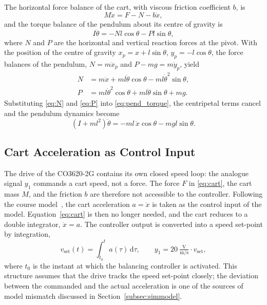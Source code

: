 The horizontal force balance of the cart, with viscous friction coefficient $b$,
is
\begin{equation}
  M\ddot{x} = F - N - b\dot{x},
  \label{eq:cart}
\end{equation}
and the torque balance of the pendulum about its centre of gravity is
\begin{equation}
  I\ddot{\theta} = -Nl\cos\theta - Pl\sin\theta,
  \label{eq:pend_torque}
\end{equation}
where $N$ and $P$ are the horizontal and vertical reaction forces at the pivot.
With the position of the centre of gravity
$x_p = x + l\sin\theta$, $y_p = -l\cos\theta$, the force balances of the
pendulum, $N = m\ddot{x}_p$ and $P - mg = m\ddot{y}_p$, yield
\begin{align}
  N &= m\ddot{x} + ml\ddot{\theta}\cos\theta - ml\dot{\theta}^2\sin\theta,
  \label{eq:N}\\
  P &= ml\dot{\theta}^2\cos\theta + ml\ddot{\theta}\sin\theta + mg.
  \label{eq:P}
\end{align}
Substituting \eqref{eq:N} and \eqref{eq:P} into \eqref{eq:pend_torque}, the
centripetal terms cancel and the pendulum dynamics become
\begin{equation}
  \left(I + ml^2\right)\ddot{\theta} = -ml\,\ddot{x}\cos\theta - mgl\sin\theta .
  \label{eq:pend_nl}
\end{equation}

\subsection{Cart Acceleration as Control Input}
\label{subsec:input}

The drive of the CO3620-2G contains its own closed speed loop: the analogue
signal $y_1$ commands a cart speed, not a force. The force $F$ in
\eqref{eq:cart}, the cart mass $M$, and the friction $b$ are therefore not
accessible to the controller. Following the course model~\cite{ln_manual}, the
cart acceleration $a = \ddot{x}$ is taken as the control input of the model.
Equation~\eqref{eq:cart} is then no longer needed, and the cart reduces to a
double integrator, $\ddot{x} = a$. The controller output is converted into a
speed set-point by integration,
\begin{equation}
  v_{\mathrm{set}}(t) = \int_{t_0}^{t} a(\tau)\,\mathrm{d}\tau, \qquad
  y_1 = 20~\tfrac{\mathrm{V}}{\mathrm{m/s}} \cdot v_{\mathrm{set}},
  \label{eq:integrator}
\end{equation}
where $t_0$ is the instant at which the balancing controller is activated. This
structure assumes that the drive tracks the speed set-point closely; the
deviation between the commanded and the actual acceleration is one of the
sources of model mismatch discussed in Section~\ref{subsec:simmodel}.

